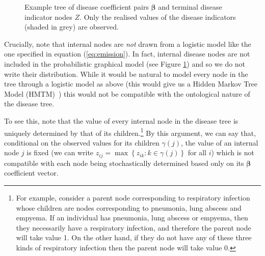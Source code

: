 \documentclass[10pt]{article}
\newcommand{\B}{\symbf{\beta}}
\begin{document}
 \begin{figure}[h!]
   \centering
   \caption{Example tree of disease coefficient pairs $\B$ and terminal disease indicator nodes $Z$. Only the realised values of the disease indicators (shaded in grey) are observed.}\label{fig:treewas}
 \end{figure}

Crucially, note that internal nodes are \textit{not} drawn from a logistic model like the one specified in equation (\ref{eq:emission}). In fact, internal disease nodes are not included in the probabilistic graphical model (see Figure \ref{fig:treewas}) and so we do not write their distribution. While it would be natural to model every node in the tree through a logistic model as above (this would give us a Hidden Markov Tree Model (HMTM)~\citep{Crouse1998}) this would not be compatible with the ontological nature of the disease tree.

To see this, note that the value of every internal node in the disease tree is uniquely determined by that of its children.\footnote{For example, consider a parent node corresponding to respiratory infection whose children are nodes corresponding to pneumonia, lung abscess and empyema. If an individual has pneumonia, lung abscess or empyema, then they necessarily have a respiratory infection, and therefore the parent node will take value 1. On the other hand, if they do not have any of these three kinds of respiratory infection then the parent node will take value 0.} By this argument, we can say that, conditional on the observed values for its children $\gamma(j)$, the value of an internal node $j$ is fixed (we can write $z_{ij} = \max \left\{z_{ik} : k\in\gamma(j)\right\}$ for all $i$) which is not compatible with each node being stochastically determined based only on its $\B$ coefficient vector.
\end{document}
